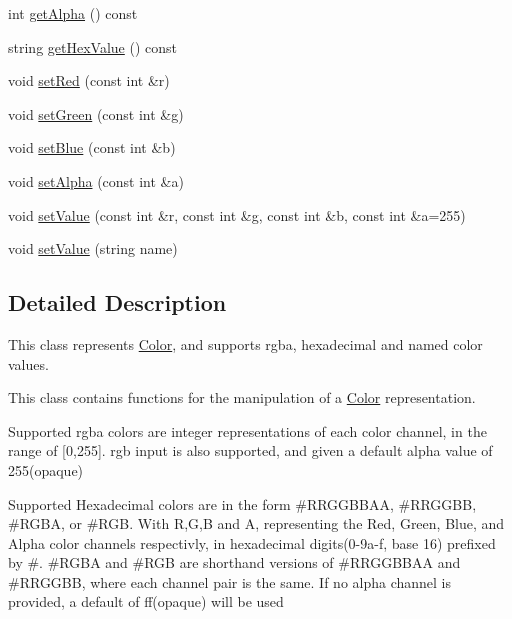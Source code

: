 \begin{DoxyCompactItemize}
int \mbox{\hyperlink{classbridges_1_1_color_a61523716f5597013d57bc98eae1fe96a}{get\+Alpha}} () const
\item 
string \mbox{\hyperlink{classbridges_1_1_color_a051fa9e828ce7025093c65c46358a8cf}{get\+Hex\+Value}} () const
\item 
void \mbox{\hyperlink{classbridges_1_1_color_a56ff7cf20ccf252ed5fd9d1836693c42}{set\+Red}} (const int \&r)
\item 
void \mbox{\hyperlink{classbridges_1_1_color_ad7522440e9772446b66d699cda307704}{set\+Green}} (const int \&g)
\item 
void \mbox{\hyperlink{classbridges_1_1_color_abbde3c596c48b1870a305164b51dc9b5}{set\+Blue}} (const int \&b)
\item 
void \mbox{\hyperlink{classbridges_1_1_color_af2ab47aa5ccafb74be9ef8e6042093a1}{set\+Alpha}} (const int \&a)
\item 
void \mbox{\hyperlink{classbridges_1_1_color_a1bbb6b478ac6a013d04951f564bab70d}{set\+Value}} (const int \&r, const int \&g, const int \&b, const int \&a=255)
\item 
void \mbox{\hyperlink{classbridges_1_1_color_aa6e1db9aa47275ef829ac0fa96d72190}{set\+Value}} (string name)
\end{DoxyCompactItemize}


\subsection{Detailed Description}
This class represents \mbox{\hyperlink{classbridges_1_1_color}{Color}}, and supports rgba, hexadecimal and named color values. 

This class contains functions for the manipulation of a \mbox{\hyperlink{classbridges_1_1_color}{Color}} representation.

Supported rgba colors are integer representations of each color channel, in the range of \mbox{[}0,255\mbox{]}. rgb input is also supported, and given a default alpha value of 255(opaque)

Supported Hexadecimal colors are in the form \#\+R\+R\+G\+G\+B\+B\+AA, \#\+R\+R\+G\+G\+BB, \#\+R\+G\+BA, or \#\+R\+GB. With R,G,B and A, representing the Red, Green, Blue, and Alpha color channels respectivly, in hexadecimal digits(0-\/9a-\/f, base 16) prefixed by \textquotesingle{}\#\textquotesingle{}. \#\+R\+G\+BA and \#\+R\+GB are shorthand versions of \#\+R\+R\+G\+G\+B\+B\+AA and \#\+R\+R\+G\+G\+BB, where each channel pair is the same. If no alpha channel is provided, a default of \textquotesingle{}ff\textquotesingle{}(opaque) will be used

